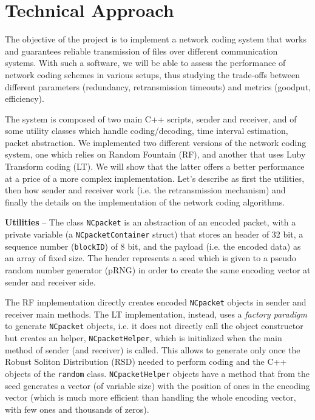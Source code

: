 \section{Technical Approach}\label{sec:impl}
\setlength{\abovecaptionskip}{10pt plus 3pt minus 2pt}

The objective of the project is to implement a network coding system that works and guarantees reliable transmission of files over different communication systems. With such a software, we will be able to assess the performance of network coding schemes in various setups, thus studying the trade-offs between different parameters (redundancy, retransmission timeouts) and metrics (goodput, efficiency).

The system is composed of two main C++ scripts, sender and receiver, and of some utility classes which handle coding/decoding, time interval estimation, packet abstraction. We implemented two different versions of the network coding system, one which relies on Random Fountain (RF), and another that uses Luby Transform coding (LT). We will show that the latter offers a better performance at a price of a more complex implementation. Let's describe as first the utilities, then how sender and receiver work (i.e. the retransmission mechanism) and finally the details on the implementation of the network coding algorithms.

\textbf{Utilities} -- The class \texttt{NCpacket} is an abstraction of an encoded packet, with a private variable (a \newline \texttt{NCpacketContainer} struct) that stores an header of 32 bit, a sequence number (\texttt{blockID}) of 8 bit, and the payload (i.e. the encoded data) as an array of fixed size. 
The header represents a seed which is given to a pseudo random number generator (pRNG) in order to create the same encoding vector at sender and receiver side. 

The RF implementation directly creates encoded \texttt{NCpacket} objects in sender and receiver main methods.
The LT implementation, instead, uses a \textit{factory paradigm} to generate \texttt{NCpacket} objects, i.e. it does not directly call the object constructor but creates an helper, \texttt{NCpacketHelper}, which is initialized when the main method of sender (and receiver) is called. This allows to generate only once the Robust Soliton Distribution (RSD) needed to perform coding and the C++ objects of the \texttt{random} class. \texttt{NCpacketHelper} objects have a method that from the seed generates a vector (of variable size) with the position of ones in the encoding vector (which is much more efficient than handling the whole encoding vector, with few ones and thousands of zeros).

